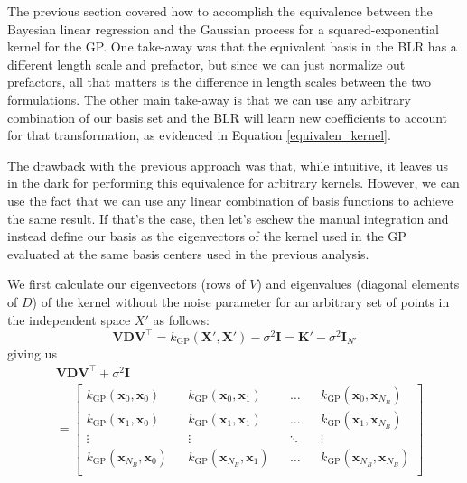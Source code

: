 \documentclass{article}
\begin{document}
The previous section covered how to accomplish the equivalence between the Bayesian linear regression and the Gaussian process for a squared-exponential kernel for the GP. One take-away was that the equivalent basis in the BLR has a different length scale and prefactor, but since we can just normalize out prefactors, all that matters is the difference in length scales between the two formulations. The other main take-away is that we can use any arbitrary combination of our basis set and the BLR will learn new coefficients to account for that transformation, as evidenced in Equation \ref{equivalen_kernel}.

The drawback with the previous approach was that, while intuitive, it leaves us in the dark for performing this equivalence for arbitrary kernels. However, we can use the fact that we can use any linear combination of basis functions to achieve the same result. If that's the case, then let's eschew the manual integration and instead define our basis as the eigenvectors of the kernel used in the GP evaluated at the same basis centers used in the previous analysis.

We first calculate our eigenvectors (rows of $V$) and eigenvalues (diagonal elements of $D$) of the kernel without the noise parameter for an arbitrary set of points in the independent space $X'$ as follows:
\begin{equation}
 \mathbf{VDV}^\top=k_\text{GP}(\mathbf{X}',\mathbf{X}')-\sigma^2 \mathbf{I}=\mathbf{K}'-\sigma^2 \mathbf{I}_{N'}
\end{equation}giving us\begin{equation}
\begin{split}
\label{VDV}
    &\mathbf{VDV}^\top+\sigma^2 \mathbf{I} \\&= 
    \begin{bmatrix}
    k_\text{GP}(\mathbf{x}_0,\mathbf{x}_0) && k_\text{GP}(\mathbf{x}_0,\mathbf{x}_1) && \dots && k_\text{GP}(\mathbf{x}_0,\mathbf{x}_{N_B}) \\
    k_\text{GP}(\mathbf{x}_1,\mathbf{x}_0) && k_\text{GP}(\mathbf{x}_1,\mathbf{x}_1) && \dots && k_\text{GP}(\mathbf{x}_1,\mathbf{x}_{N_B}) \\
    \vdots && \vdots && \ddots && \vdots \\
    k_\text{GP}(\mathbf{x}_{N_B},\mathbf{x}_0) && k_\text{GP}(\mathbf{x}_{N_B},\mathbf{x}_1) && \dots && k_\text{GP}(\mathbf{x}_{N_B},\mathbf{x}_{N_B}) \\
    \end{bmatrix}
    \end{split}
\end{equation}
\end{document}

